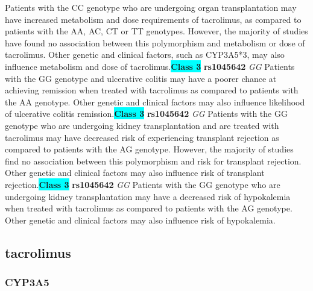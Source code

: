 \documentclass{book}
\begin{document}
\begin{center}
Patients with the CC genotype who are undergoing organ transplantation may have increased metabolism and dose requirements of tacrolimus, as compared to patients with the AA, AC, CT or TT genotypes. However, the majority of studies have found no association between this polymorphism and metabolism or dose of tacrolimus. Other genetic and clinical factors, such as CYP3A5*3, may also influence metabolism and dose of tacrolimus.\textbf{\colorbox{cyan} {Class 3}} \textbf{ rs1045642 } \textit{ GG }
Patients with the GG genotype and ulcerative colitis may have a poorer chance at achieving remission when treated with tacrolimus as compared to patients with the AA genotype. Other genetic and clinical factors may also influence likelihood of ulcerative colitis remission.\textbf{\colorbox{cyan} {Class 3}} \textbf{ rs1045642 } \textit{ GG }
Patients with the GG genotype who are undergoing kidney transplantation and are treated with tacrolimus may have decreased risk of experiencing transplant rejection as compared to patients with the AG genotype. However, the majority of studies find no association between this polymorphism and risk for transplant rejection. Other genetic and clinical factors may also influence risk of transplant rejection.\textbf{\colorbox{cyan} {Class 3}} \textbf{ rs1045642 } \textit{ GG }
Patients with the GG genotype who are undergoing kidney transplantation may have a decreased risk of hypokalemia when treated with tacrolimus as compared to patients with the AG genotype. Other genetic and clinical factors may also influence risk of hypokalemia.


\end{center}\subsection{ tacrolimus }


\subsubsection{ CYP3A5 }
\end{document}
